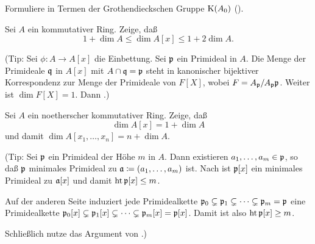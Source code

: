 \begin{exercise}
	Formuliere  in Termen der Grothendieckschen Gruppe \(\operatorname{K}(A_0)\) (). 
\end{exercise}

\begin{exercise}
	\label{exer:poly_dim}
	Sei \(A\) ein kommutativer Ring. Zeige, daß
	\[
		1 + \dim A \le \dim A[x] \le 1 + 2 \dim A.
	\]
	
	(Tip: Sei \(\phi\colon A \to A[x]\) die Einbettung. Sei \(\mathfrak{p}\) ein Primideal in \(A\). Die Menge der Primideale
	\(\mathfrak{q}\) in \(A[x]\) mit \(A \cap \mathfrak{q} = \mathfrak{p}\) steht in kanonischer bijektiver Korrespondenz zur Menge der
	Primideale von \(F[X]\), wobei \(F = A_{\mathfrak{p}}/A_{\mathfrak{p}} \mathfrak{p}\). Weiter ist \(\dim F[X] = 1\). Dann
	.)
\end{exercise}

\begin{exercise}
	Sei \(A\) ein noetherscher kommutativer Ring. Zeige, daß
	\[
		\dim A[x] = 1 + \dim A
	\]
	und damit \(\dim A[x_1, \dotsc, x_n] = n + \dim A\).
	
	(Tip: Sei \(\mathfrak{p}\) ein Primideal der Höhe \(m\) in \(A\). Dann existieren \(a_1, \dotsc, a_m \in \mathfrak{p}\), so daß
	\(\mathfrak{p}\) minimales Primideal zu \(\mathfrak{a} \coloneqq (a_1, \dotsc, a_m)\) ist. Nach 
	ist \(\mathfrak{p}[x]\)	ein minimales Primideal zu \(\mathfrak{a}[x]\) und damit \(\operatorname{ht} \mathfrak{p}[x] \leq m\).
	
	Auf der anderen Seite induziert jede Primidealkette \(\mathfrak{p}_0 \subsetneq \mathfrak{p}_1 \subsetneq \dotsb \subsetneq
	\mathfrak{p}_m = \mathfrak{p}\) eine Primidealkette \(\mathfrak{p}_0[x] \subsetneq \mathfrak{p}_1[x] \subsetneq \dotsb \subsetneq
	\mathfrak{p}_m[x] = \mathfrak{p}[x]\). Damit ist also \(\operatorname{ht} \mathfrak{p}[x] \ge m\).
	
	Schließlich nutze das Argument von .)
\end{exercise}

